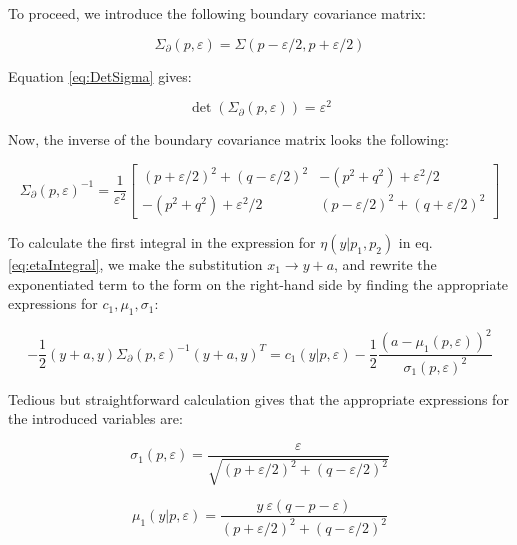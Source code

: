 \documentclass{article}
\theoremstyle{definition}
\begin{document}
To proceed, we introduce the following boundary covariance matrix:

\begin{equation}
    \Sigma_\partial(p,\varepsilon)
    =
    \Sigma(p-\varepsilon/2,p+\varepsilon/2)
\end{equation}

Equation \eqref{eq:DetSigma} gives:

\begin{equation}
    \det(\Sigma_\partial(p,\varepsilon)) = \varepsilon^2
\end{equation}

Now, the inverse of the boundary covariance matrix looks the following:

\begin{equation}
    \Sigma_\partial(p,\varepsilon)^{-1} =
    \frac{1}{\varepsilon^2} 
    \begin{bmatrix}
    (p+\varepsilon/2)^2+(q-\varepsilon/2)^2 & -(p^2 + q^2) + \varepsilon^2/2 \\
    -(p^2 + q^2) + \varepsilon^2/2 & (p-\varepsilon/2)^2+(q+\varepsilon/2)^2
    \end{bmatrix}
\end{equation}

To calculate the first integral in the expression for $\eta(y|p_1,p_2)$ in eq. \eqref{eq:etaIntegral}, we make the substitution $x_1 \to y + a$, and rewrite the exponentiated term to the form on the right-hand side by finding the appropriate expressions for $c_1, \mu_1, \sigma_1$:

\begin{equation}
    -\frac{1}{2} (y+a,y) \Sigma_\partial(p,\varepsilon)^{-1} (y+a,y)^T = c_1(y|p,\varepsilon) - \frac{1}{2} \frac{(a-\mu_1(p,\varepsilon))^2}{\sigma_1(p,\varepsilon)^2} 
\end{equation}

Tedious but straightforward calculation gives that the appropriate expressions for the introduced variables are:

\begin{equation}
    \sigma_1(p,\varepsilon) = \frac{\varepsilon}{\sqrt{(p+\varepsilon/2)^2+(q-\varepsilon/2)^2}}
\end{equation}

\begin{equation}
    \mu_1(y|p,\varepsilon)
    =
    \frac{y \ \varepsilon (q-p-\varepsilon)}{(p+\varepsilon/2)^2+(q-\varepsilon/2)^2}
\end{equation}
\end{document}
